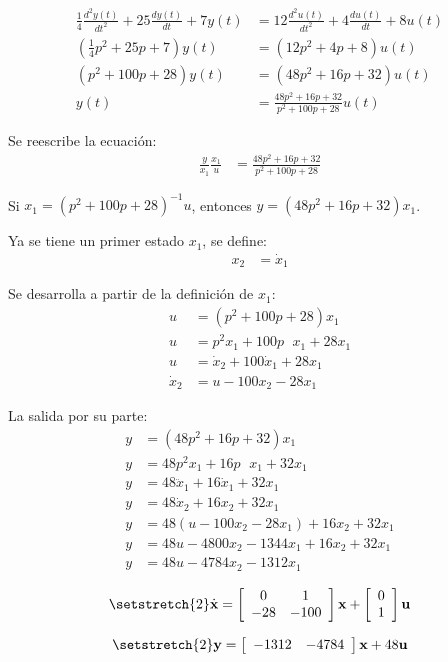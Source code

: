 \begin{align*}
  \frac{1}{4}\frac{d^2y(t)}{dt^2} + 25 \frac{dy(t)}{dt} + 7 y(t)
  &= 12 \frac{d^2u(t)}{dt^2} + 4 \frac{du(t)}{dt} + 8u(t)
  \\
  \left( \frac{1}{4}p^2 + 25p + 7 \right) y(t)
  &= \left(12p^2 + 4p + 8\right) u(t)
  \\
  \left( p^2 + 100p + 28 \right) y(t)
  &= \left(48p^2 + 16p + 32\right) u(t)
  \\
  y(t) &= \frac{48p^2 + 16p + 32}{p^2 + 100p + 28} u(t)
\end{align*}

Se reescribe la ecuación:
\begin{align*}
  \frac{y}{x_1} \frac{x_1}{u} &= \frac{48p^2 + 16p + 32}{p^2 + 100p + 28}
\end{align*}

Si $x_1 = \left(p^2 + 100p + 28\right)^{-1}u$, entonces $y = (48p^2 + 16p + 32)x_1$.

Ya se tiene un primer estado $x_1$, se define:
\begin{align*}
  x_2 &= \dot{x}_1
\end{align*}

Se desarrolla a partir de la definición de $x_1$:
\begin{align*}
  u &= \left(p^2 + 100p + 28\right)x_1 \\
  u &= p^2 x_1 + 100p \phantom{\cdot} x_1 + 28 x_1 \\
  u &= \dot{x}_2 + 100 \dot{x}_1 + 28 x_1 \\
  \dot{x}_2 &= u - 100 x_2 - 28 x_1
\end{align*}

La salida por su parte:
\begin{align*}
  y &= (48p^2 + 16p + 32)x_1 \\
  y &= 48p^2 x_1 + 16p\phantom{\cdot} x_1 + 32 x_1 \\
  y &= 48 \ddot{x}_1 + 16 \dot{x}_1 + 32 x_1 \\
  y &= 48 \dot{x}_2 + 16 x_2 + 32 x_1 \\
  y &= 48 (u - 100 x_2 - 28 x_1) + 16 x_2 + 32 x_1 \\
  y &= 48 u - 4800 x_2 - 1344 x_1 + 16 x_2 + 32 x_1 \\
  y &= 48 u - 4784 x_2 - 1312 x_1
\end{align*}

\[ \setstretch{2}
  \dot{\textbf{x}}=
  \left[
    {\begin{array}{cc}
      0   & 1    \\
      -28 & -100 \\
    \end{array}}
  \right]
  \textbf{x} +
  \left[
    {\begin{array}{cc}
      0 \\
      1 \\
    \end{array}}
  \right]
  \textbf{u}
\]

\[ \setstretch{2}
  \textbf{y}=
  \left[
    {\begin{array}{ccc}
      -1312 & -4784 \\
    \end{array}}
  \right]
  \textbf{x} +
  48
  \textbf{u}
\]

